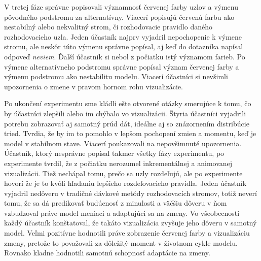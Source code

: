\par
V tretej fáze správne popisovali významnosť červenej farby uzlov a výmenu pôvodného podstromu za alternatívny. Viacerí popisujú červenú farbu ako nestabilný alebo nekvalitný strom, či rozhodovacie pravidlo daného rozhodovacieho uzla. Jeden účastník najprv vyjadril nepochopenie k výmene stromu, ale neskôr túto výmenu správne popísal, aj keď do dotazníka napísal odpoveď \textit{neviem}. Ďalší účastník si nebol z počiatku istý významom farieb. Po výmene alternatívneho podstromu správne popísal význam červenej farby a výmenu podstromu ako nestabilitu modelu. Viacerí účastníci si nevšimli upozornenia o zmene v pravom hornom rohu vizualizácie.
\par
Po ukončení experimentu sme kládli ešte otvorené otázky smerujúce k tomu, čo by účastníci zlepšili alebo im chýbalo vo vizualizácii. Štyria účastníci vyjadrili potrebu zobrazovať aj samotný prúd dát, ideálne aj so znázornením distribúcie tried. Tvrdia, že by im to pomohlo v lepšom pochopení zmien a momentu, keď je model v stabilnom stave. Viacerí poukazovali na nepovšimnuté upozornenia. Účastník, ktorý nesprávne popísal takmer všetky fázy experimentu, po experimente tvrdil, že z počiatku nerozumel inkrementálnej a animovanej vizualizácii. Tiež nechápal tomu, prečo sa uzly rozdeľujú, ale po experimente hovorí že je to kvôli hľadaniu lepšieho rozdeľovacieho pravidla. Jeden účastník vyjadril nedôveru v tradičné dávkové metódy rozhodovacích stromov, totiž neverí tomu, že sa dá predikovať budúcnosť z minulosti a väčšiu dôveru v ňom vzbudzoval práve model meniaci a adaptujúci sa na zmeny. Vo všeobecnosti každý účastník konštatoval, že takáto vizualizácia zvyšuje jeho dôveru v samotný model. Veľmi pozitívne hodnotili práve zobrazenie červenej farby a vizualizáciu zmeny, pretože to považovali za dôležitý moment v životnom cykle modelu. Rovnako kladne hodnotili samotnú schopnosť adaptácie na zmeny.







































